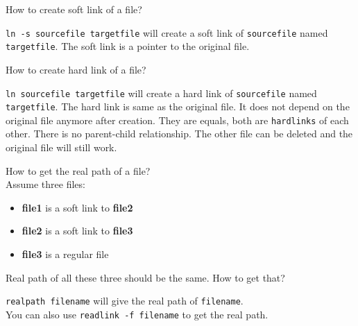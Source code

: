 \begin{qs}
  How to create soft link of a file?
\end{qs}

\begin{ans}
  \texttt{ln -s sourcefile targetfile} will create a soft link of \texttt{sourcefile}
  named \texttt{targetfile}.
  The soft link is a pointer to the original file.
\end{ans}

\begin{qs}
  How to create hard link of a file?
\end{qs}

\begin{ans}
  \texttt{ln sourcefile targetfile} will create a hard link of \texttt{sourcefile}
  named \texttt{targetfile}. The hard link is same as the original file. It does
  not depend on the original file anymore after creation. They are equals,
  both are \texttt{hardlinks} of each other. There is no parent-child relationship.
  The other file can be deleted and the original file will still work.
\end{ans}

\begin{qs}
  How to get the real path of a file?\\
  Assume three files:
  \begin{itemize}
    \item \textbf{file1} is a soft link to \textbf{file2}
    \item \textbf{file2} is a soft link to \textbf{file3}
    \item \textbf{file3} is a regular file
  \end{itemize}
  Real path of all these three should be the same. How to get that?
\end{qs}

\begin{ans}
  \texttt{realpath filename} will give the real path of \texttt{filename}. \\
  You can also use \texttt{readlink -f filename} to get the real path.
\end{ans}


